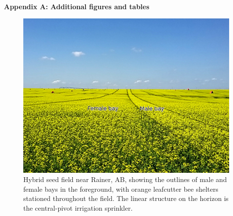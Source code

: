 \setcounter{equation}{0} %
\makeatletter
\renewcommand{\theequation}{S\arabic{equation}} %
\renewcommand{\thefigure}{S\arabic{figure}}
\renewcommand{\thetable}{S\arabic{table}}
\renewcommand{\bibnumfmt}[1]{[S#1]}
\renewcommand{\citenumfont}[1]{S#1}

\pagebreak
\begin{center}
\textbf{\large Appendix A: Additional figures and tables}
\end{center}

\begin{figure}
    \centering
    \includegraphics[width=\textwidth,keepaspectratio=true]{seedfieldBays.jpg}
    \caption[Hybrid seed field near Rainer, AB]{Hybrid seed field near Rainer, AB, showing the outlines of male and female bays in the foreground, with orange leafcutter bee shelters stationed throughout the field. The linear structure on the horizon is the central-pivot irrigation sprinkler.}
    \label{fig:seedfieldPhoto}
\end{figure}

